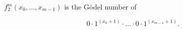 $f_2^m (x_0, \ldots, x_{m-1})$ is the Gödel number of

$$0 \cdot 1^{(x_0+1)} \cdot \ldots \cdot 0 \cdot 1^{(x_{m-1}+1)}.$$

